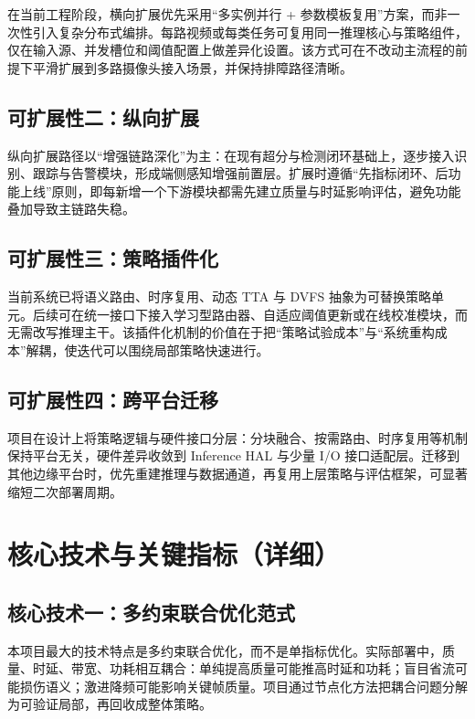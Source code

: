 \documentclass[12pt,a4paper]{ctexart}
\begin{document}
在当前工程阶段，横向扩展优先采用“多实例并行 + 参数模板复用”方案，而非一次性引入复杂分布式编排。每路视频或每类任务可复用同一推理核心与策略组件，仅在输入源、并发槽位和阈值配置上做差异化设置。该方式可在不改动主流程的前提下平滑扩展到多路摄像头接入场景，并保持排障路径清晰。

\subsection{可扩展性二：纵向扩展}

纵向扩展路径以“增强链路深化”为主：在现有超分与检测闭环基础上，逐步接入识别、跟踪与告警模块，形成端侧感知增强前置层。扩展时遵循“先指标闭环、后功能上线”原则，即每新增一个下游模块都需先建立质量与时延影响评估，避免功能叠加导致主链路失稳。

\subsection{可扩展性三：策略插件化}

当前系统已将语义路由、时序复用、动态 TTA 与 DVFS 抽象为可替换策略单元。后续可在统一接口下接入学习型路由器、自适应阈值更新或在线校准模块，而无需改写推理主干。该插件化机制的价值在于把“策略试验成本”与“系统重构成本”解耦，使迭代可以围绕局部策略快速进行。

\subsection{可扩展性四：跨平台迁移}

项目在设计上将策略逻辑与硬件接口分层：分块融合、按需路由、时序复用等机制保持平台无关，硬件差异收敛到 Inference HAL 与少量 I/O 接口适配层。迁移到其他边缘平台时，优先重建推理与数据通道，再复用上层策略与评估框架，可显著缩短二次部署周期。

\section{核心技术与关键指标（详细）}

\subsection{核心技术一：多约束联合优化范式}

本项目最大的技术特点是多约束联合优化，而不是单指标优化。实际部署中，质量、时延、带宽、功耗相互耦合：单纯提高质量可能推高时延和功耗；盲目省流可能损伤语义；激进降频可能影响关键帧质量。项目通过节点化方法把耦合问题分解为可验证局部，再回收成整体策略。
\end{document}
